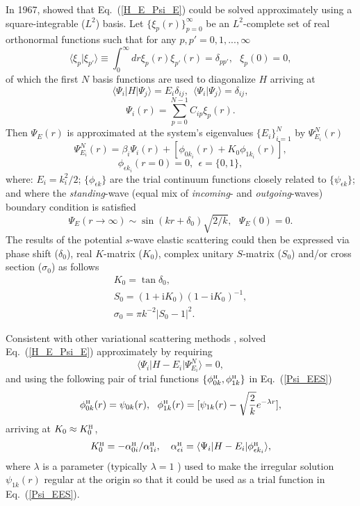\documentclass[aip
, pra
, showpacs
, aps
, twocolumn
, groupedaddress
, floatfix
]{revtex4}
\newcommand{\beq}{\begin{equation}}
\newcommand{\eeq}{\end{equation}}
\newcommand{\barr}{\begin{array}}
\newcommand{\earr}{\end{array}}
\newcommand{\phiH}{\phi^{\mbox{\tiny{H}}}}
\begin{document}
In 1967, \citet{Harris67} showed that Eq.~(\ref{H_E_Psi_E}) could be solved
approximately using a square-integrable ($L^2$) basis.
Let $\{\xi_p(r)\}_{p=0}^\infty$ be an $L^2$-complete set of real orthonormal functions
such that for any $p,p'=0,1,...,\infty$
\beq
\langle \xi_p | \xi_{p'} \rangle \equiv \int_0^\infty dr \xi_p(r) \xi_{p'}(r) =\delta_{pp'}, \ \ \ \xi_p(0)=0,
\eeq
of which the first $N$ basis functions are used to diagonalize $H$ arriving at
\beq
\langle \Psi_i |H| \Psi_j \rangle = E_i \delta_{ij} , \ \ \langle \Psi_i | \Psi_j \rangle=\delta_{ij},
\eeq
\beq
\Psi_i(r) = \sum_{p=0}^{N-1} C_{ip} \xi_p(r).
\eeq
Then $\Psi_E(r)$ is approximated at the system's eigenvalues $\{E_i\}_{i=1}^{N}$ by $\Psi^N_{E_i}(r)$
\cite{Harris67}
\beq
\Psi^N_{E_i}(r) = \beta_i \Psi_i(r)  + [\phi_{0k_i}(r)  + K_{0} \phi_{1k_i}(r)],
\label{Psi_EES} \eeq
\beq
\phi_{\epsilon k_i}(r=0) = 0, \ \ \epsilon = \{0,1\},
\eeq
where: $E_i=k_i^2/2$; $\{\phi_{\epsilon k}\}$ are the trial continuum functions closely related to $\{\psi_{\epsilon k}\}$; and where the {\em standing}-wave (equal mix of {\em incoming}- and {\em outgoing}-waves) boundary condition is satisfied
\beq
\Psi_E(r \rightarrow \infty) \sim  \sin(kr+\delta_0) \sqrt{2/k}, \ \ \ \Psi_E(0)=0.   \label{stand_wave}
\eeq
The results of the potential $s$-wave elastic scattering could then be expressed via
phase shift ($\delta_0$), real $K$-matrix ($K_0$), complex unitary $S$-matrix ($S_{0}$) and/or cross section ($\sigma_{0}$)
as follows
\beq \barr{l}
K_{0} = \tan{\delta_0},\\
S_{0}=(1+\mbox{i}K_0)(1-\mbox{i}K_0)^{-1}, \\
\sigma_{0}=\pi k^{-2} |S_{0}-1|^2.
\earr \eeq


Consistent with other variational scattering methods \cite{Nesbet68},
\citet{Harris67} solved Eq.~(\ref{H_E_Psi_E}) approximately by requiring
\beq
\langle\Psi_i|H-E_i|\Psi^N_{E_i}\rangle=0,  \label{EES_ONE_C1}
\eeq
and using the following pair of trial functions $\{\phiH_{0k}, \phiH_{1k} \}$ in
Eq.~(\ref{Psi_EES})
\beq
\phiH_{0k}(r) =  \psi_{0k}(r),\ \
\phiH_{1k}(r) =  [\psi_{1k}(r) - \sqrt{\frac{2}{k}} e^{-\lambda r}],
\label{def_phi_H} \eeq
arriving at $K_0\approx K^{\mbox{\tiny{H}}}_{0}$,
\beq \barr{l}
K^{\mbox{\tiny{H}}}_{0} = - \alpha^{\mbox{\tiny{H}}}_{0i} / \alpha^{\mbox{\tiny{H}}}_{1i}, \ \ \ 
\alpha^{\mbox{\tiny{H}}}_{\epsilon i} = \langle\Psi_i|H-E_i|  \phiH_{\epsilon k_i} \rangle,
\earr \label{K_0_Harris} \eeq
where $\lambda$ is a parameter (typically $\lambda=1$ \cite{Nesbet68}) used to make the irregular solution $\psi_{1k}(r)$ regular
at the origin so that it could be used as a trial function in Eq.~(\ref{Psi_EES}).
\end{document}
